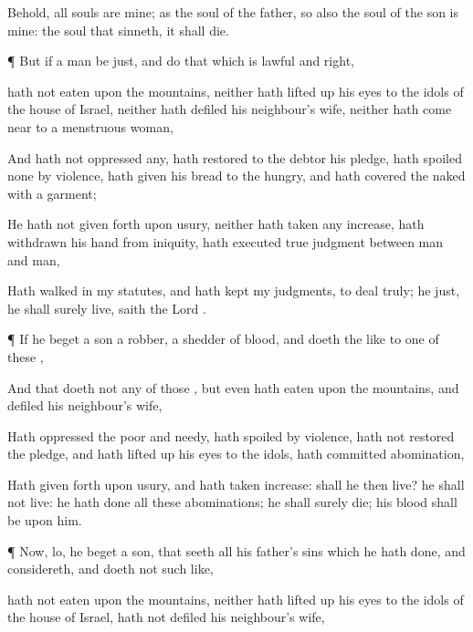 {Behold, all
souls are mine; as the
soul of the
father, so also the
soul of the
son is mine: the
soul that
sinneth, it shall
die.


\par }{\PP {}¶ But if a
man be
just, and
do that which is
lawful and
right,

 hath not
eaten upon the
mountains, neither hath lifted
up his
eyes to the
idols of the
house of
Israel, neither hath
defiled his
neighbour’s
wife, neither hath come
near to a
menstruous
woman,

And hath not
oppressed
any,
{} hath
restored to the
debtor his
pledge, hath
spoiled none by
violence, hath
given his
bread to the
hungry, and hath
covered the
naked with a
garment;

He
{} hath not given
forth upon
usury, neither hath
taken any
increase,
{} hath
withdrawn his
hand from
iniquity, hath
executed
true
judgment between
man and
man,

Hath
walked in my
statutes, and hath
kept my
judgments, to
deal
truly; he
{}
just, he shall
surely
live,
saith the
Lord
{}.


\par }{\PP {}¶ If he
beget a
son
{} a
robber, a
shedder of
blood, and
{}
doeth the
like to
{}
one of these
{},

And that
doeth not any of those
{}, but even hath
eaten upon the
mountains, and
defiled his
neighbour’s
wife,

Hath
oppressed the
poor and
needy, hath
spoiled by
violence, hath not
restored the
pledge, and hath lifted
up his
eyes to the
idols, hath
committed
abomination,

Hath given
forth upon
usury, and hath
taken
increase: shall he then
live? he shall not
live: he hath
done all these
abominations; he shall
surely
die; his
blood shall be upon him.


\par }{\PP {}¶ Now, lo,
{} he
beget a
son, that
seeth all his
father’s
sins which he hath
done, and
considereth, and
doeth not such
like,

 hath not
eaten upon the
mountains, neither hath lifted
up his
eyes to the
idols of the
house of
Israel, hath not
defiled his
neighbour’s
wife,

}
